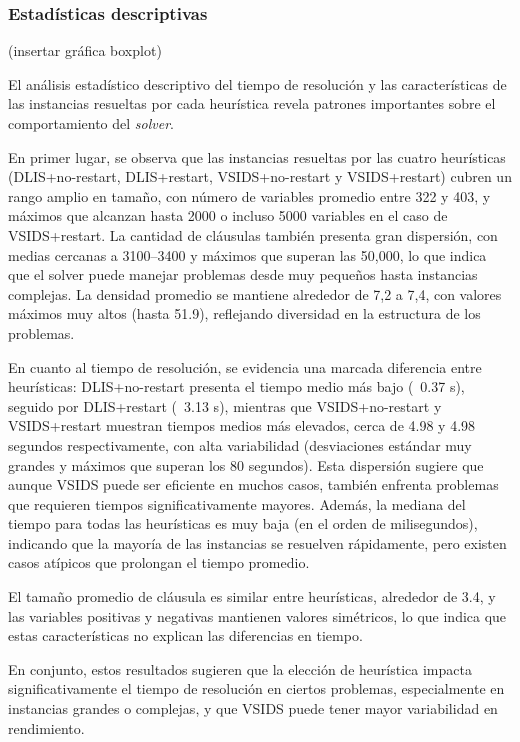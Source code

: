 \subsubsection{Estad\'isticas descriptivas}
(insertar gr\'afica boxplot)

El análisis estadístico descriptivo del tiempo de resolución y las características de las instancias resueltas por cada heurística revela patrones importantes sobre el comportamiento del \textit{solver}.

En primer lugar, se observa que las instancias resueltas por las cuatro heurísticas (DLIS+no-restart, DLIS+restart, VSIDS+no-restart y VSIDS+restart) cubren un rango amplio en tamaño, con número de variables promedio entre 322 y 403, y máximos que alcanzan hasta 2000 o incluso 5000 variables en el caso de VSIDS+restart. La cantidad de cláusulas también presenta gran dispersión, con medias cercanas a 3100–3400 y máximos que superan las 50,000, lo que indica que el solver puede manejar problemas desde muy pequeños hasta instancias complejas. La densidad promedio se mantiene alrededor de 7,2 a 7,4, con valores máximos muy altos (hasta 51.9), reflejando diversidad en la estructura de los problemas.

En cuanto al tiempo de resolución, se evidencia una marcada diferencia entre heurísticas: DLIS+no-restart presenta el tiempo medio más bajo (~0.37 s), seguido por DLIS+restart (~3.13 s), mientras que VSIDS+no-restart y VSIDS+restart muestran tiempos medios más elevados, cerca de 4.98 y 4.98 segundos respectivamente, con alta variabilidad (desviaciones estándar muy grandes y máximos que superan los 80 segundos). Esta dispersión sugiere que aunque VSIDS puede ser eficiente en muchos casos, también enfrenta problemas que requieren tiempos significativamente mayores. Además, la mediana del tiempo para todas las heurísticas es muy baja (en el orden de milisegundos), indicando que la mayoría de las instancias se resuelven rápidamente, pero existen casos atípicos que prolongan el tiempo promedio.

El tamaño promedio de cláusula es similar entre heurísticas, alrededor de 3.4, y las variables positivas y negativas mantienen valores simétricos, lo que indica que estas características no explican las diferencias en tiempo.

En conjunto, estos resultados sugieren que la elección de heurística impacta significativamente el tiempo de resolución en ciertos problemas, especialmente en instancias grandes o complejas, y que VSIDS puede tener mayor variabilidad en rendimiento.


